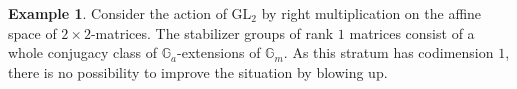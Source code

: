 \documentclass[12pt,reqno]{amsart}
\theoremstyle{plain}
\theoremstyle{remark}
\theoremstyle{definition}
\newtheorem{exam}[prop]{Example}
\numberwithin{equation}{section}
\newcommand{\G}{{\mathbb G}}
\newcommand{\GL}{{\mathrm{GL}}}
\begin{document}
\begin{exam}
\label{exa.GL2}
Consider the action of $\GL_2$ by right multiplication on the affine space of $2\times 2$-matrices.
The stabilizer groups of
rank $1$ matrices consist of a whole conjugacy class of $\G_a$-extensions of $\G_m$.
As this stratum has codimension $1$,
there is no possibility to improve the situation by blowing up.
\end{exam}






\end{document}
